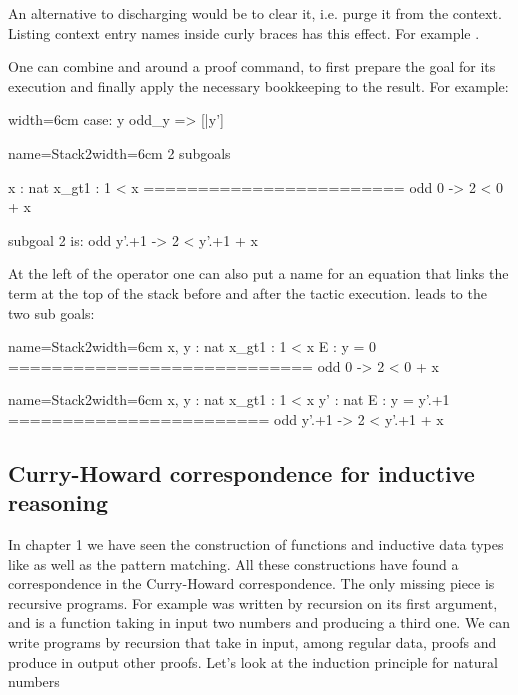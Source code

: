 An alternative to discharging  would be to clear it, i.e. purge it
from the context.  Listing context entry names inside curly braces has this
effect.  For example .

One can combine \C{:} and \C{=>} around a proof command, to first prepare the
goal for its execution and finally apply the necessary bookkeeping to the
result.  For example:

\begin{coq}{}{width=6cm}
case: y odd_y => [|y']
\end{coq}
\begin{coqout}{name=Stack2}{width=6cm}
2 subgoals
  
  x : nat
  x_gt1 : 1 < x
  ========================
   odd 0 -> 2 < 0 + x

subgoal 2 is:
 odd y'.+1 -> 2 < y'.+1 + x
\end{coqout}

At the left of the \C{:} operator one can also put a name for an
equation that links the term at the top of the stack before and
after the tactic execution.   leads to
the two sub goals:

\begin{coqout}{name=Stack2}{width=6cm}
 x, y : nat 
 x_gt1 : 1 < x 
 E : y = 0 
============================ 
 odd 0 -> 2 < 0 + x 
\end{coqout}
\begin{coqout}{name=Stack2}{width=6cm}
 x, y : nat
 x_gt1 : 1 < x
 y' : nat
 E : y = y'.+1
========================
 odd y'.+1 -> 2 < y'.+1 + x	
\end{coqout}




\subsection{Curry-Howard correspondence for inductive reasoning}

In chapter 1 we have seen the  construction of functions and inductive
data types like  as well as the pattern matching.  All these
constructions have found a correspondence in the Curry-Howard correspondence.
The only missing piece is recursive programs.  For example
 was written by recursion on its first argument, and is a
function taking in input two numbers and producing a third one.
We can write programs by recursion that take in input, among regular  data,
proofs and produce in output other proofs.  Let's look at the
induction principle for natural numbers

